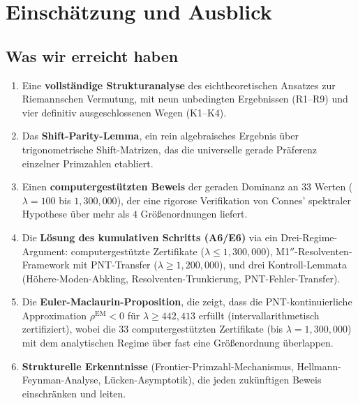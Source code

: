 \documentclass[12pt,a4paper]{article}
\theoremstyle{definition}
\theoremstyle{remark}
\begin{document}
\section{Einschätzung und Ausblick}
\label{sec:outlook}

\subsection{Was wir erreicht haben}

\begin{enumerate}
  \item Eine \textbf{vollständige Strukturanalyse} des eichtheoretischen Ansatzes zur Riemannschen Vermutung, mit neun unbedingten Ergebnissen (R1--R9) und vier definitiv ausgeschlossenen Wegen (K1--K4).

  \item Das \textbf{Shift-Parity-Lemma}, ein rein algebraisches Ergebnis über trigonometrische Shift-Matrizen, das die universelle gerade Präferenz einzelner Primzahlen etabliert.

  \item Einen \textbf{computergestützten Beweis} der geraden Dominanz an $33$ Werten ($\lambda = 100$ bis $1{,}300{,}000$), der eine rigorose Verifikation von Connes' spektraler Hypothese über mehr als $4$ Größenordnungen liefert.

  \item Die \textbf{Lösung des kumulativen Schritts (A6/E6)} via ein Drei-Regime-Argument: computergestützte Zertifikate ($\lambda \leq 1{,}300{,}000$), M1$''$-Resolventen-Framework mit PNT-Transfer ($\lambda \geq 1{,}200{,}000$), und drei Kontroll-Lemmata (Höhere-Moden-Abkling, Resolventen-Trunkierung, PNT-Fehler-Transfer).

  \item Die \textbf{Euler-Maclaurin-Proposition}, die zeigt, dass die PNT-kontinuierliche Approximation $\rho^{\mathrm{EM}} < 0$ für $\lambda \geq 442{,}413$ erfüllt (intervallarithmetisch zertifiziert), wobei die $33$ computergestützten Zertifikate (bis $\lambda = 1{,}300{,}000$) mit dem analytischen Regime über fast eine Größenordnung überlappen.

  \item \textbf{Strukturelle Erkenntnisse} (Frontier-Primzahl-Mechanismus, Hellmann-Feynman-Analyse, Lücken-Asymptotik), die jeden zukünftigen Beweis einschränken und leiten.
\end{enumerate}
\end{document}
